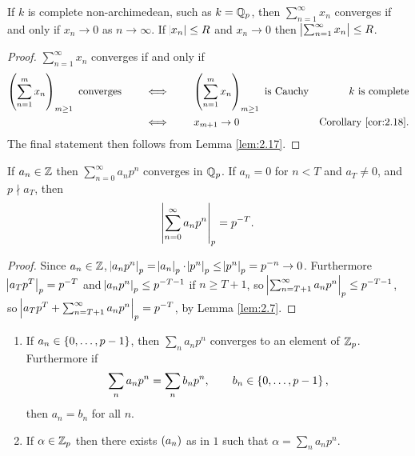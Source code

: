 \pagebreak

\begin{lemma}
If $ k $ is complete non-archimedean, such as $ k = \mathbb{Q}_p $, then $ \sum_{n = 1}^\infty x_n $ converges if and only if $ x_n \to 0 $ as $ n \to \infty $. If $ \abs{x_n} \le R $ and $ x_n \to 0 $ then $ \abs{\sum_{n = 1}^\infty x_n} \le R $.
\end{lemma}

\begin{proof}
$ \sum_{n = 1}^\infty x_n $ converges if and only if
\begin{align*}
\br{\sum_{n = 1}^m x_n}_{m \ge 1} \ \text{converges} \qquad
& \iff \qquad \br{\sum_{n = 1}^m x_n}_{m \ge 1} \ \text{is Cauchy} & k \ \text{is complete} \\
& \iff \qquad x_{m + 1} \to 0 & \text{Corollary \ref{cor:2.18}}.
\end{align*}
The final statement then follows from Lemma \ref{lem:2.17}.
\end{proof}

\begin{lemma}
\label{lem:2.20}
If $ a_n \in \mathbb{Z} $ then $ \sum_{n = 0}^\infty a_np^n $ converges in $ \mathbb{Q}_p $. If $ a_n = 0 $ for $ n < T $ and $ a_T \ne 0 $, and $ p \nmid a_T $, then
$$ \abs{\sum_{n = 0}^\infty a_np^n}_p = p^{-T}. $$
\end{lemma}

\begin{proof}
Since $ a_n \in \mathbb{Z} $, $ \abs{a_np^n}_p = \abs{a_n}_p \cdot \abs{p^n}_p \le \abs{p^n}_p = p^{-n} \to 0 $. Furthermore $ \abs{a_Tp^T}_p = p^{-T} $ and $ \abs{a_np^n}_p \le p^{-T - 1} $ if $ n \ge T + 1 $, so $ \abs{\sum_{n = T + 1}^\infty a_np^n}_p \le p^{-T - 1} $, so $ \abs{a_Tp^T + \sum_{n = T + 1}^\infty a_np^n}_p = p^{-T} $, by Lemma \ref{lem:2.7}.
\end{proof}


\begin{proposition}
\label{prop:2.21}
\hfill
\begin{enumerate}
\item If $ a_n \in \cbr{0, \dots, p - 1} $, then $ \sum_n a_np^n $ converges to an element of $ \mathbb{Z}_p $. Furthermore if
$$ \sum_n a_np^n = \sum_n b_np^n, \qquad b_n \in \cbr{0, \dots, p - 1}, $$
then $ a_n = b_n $ for all $ n $.
\item If $ \alpha \in \mathbb{Z}_p $ then there exists $ \br{a_n} $ as in $ 1 $ such that $ \alpha = \sum_n a_np^n $.
\end{enumerate}
\end{proposition}

